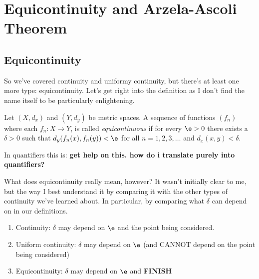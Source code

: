 \documentclass[class=article, crop=false]{standalone}
\begin{document}
\section{Equicontinuity and Arzela-Ascoli Theorem}

\subsection{Equicontinuity}

So we've covered continuity and uniformy continuity, but there's at least one more type: equicontinuity. Let's get right into the definition as I don't find the name itself to be particularly enlightening.

\begin{defn}[Equicontinuity]
    Let $(X,d_x)$ and $(Y,d_y)$ be metric spaces. A sequence of functions $(f_n)$ where each $f_n \colon X \to Y$, is called \textit{equicontinuous} if for every $\e > 0$ there exists a $\delta > 0$ such that $d_y(f_n(x),f_n(y)) < \e$ for all $n=1,2,3,\ldots$ and $d_x(x,y) < \delta$.
\end{defn}

In quantifiers this is: \textbf{get help on this. how do i translate purely into quantifiers?}

What does equicontinuity really mean, however? It wasn't initially clear to me, but the way I best understand it by comparing it with the other types of continuity we've learned about. In particular, by comparing what $\delta$ can depend on in our definitions.

\begin{enumerate}[$\bullet$]
    \item Continuity: $\delta$ may depend on $\e$ and the point being considered.
    \item Uniform continuity: $\delta$ may depend on $\e$ (and CANNOT depend on the point being considered)
    \item Equicontinuity: $\delta$ may depend on $\e$ and \textbf{FINISH}
\end{enumerate}
\end{document}
